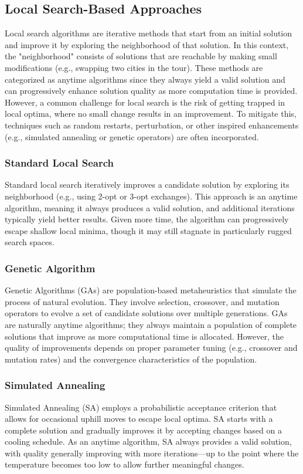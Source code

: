 \documentclass[11pt]{article}
\begin{document}
	\subsection{Local Search-Based Approaches}
	Local search algorithms are iterative methods that start from an initial solution and improve it by exploring the neighborhood of that solution. In this context, the "neighborhood" consists of solutions that are reachable by making small modifications (e.g., swapping two cities in the tour). These methods are categorized as anytime algorithms since they always yield a valid solution and can progressively enhance solution quality as more computation time is provided. However, a common challenge for local search is the risk of getting trapped in local optima, where no small change results in an improvement. To mitigate this, techniques such as random restarts, perturbation, or other inspired enhancements (e.g., simulated annealing or genetic operators) are often incorporated.
	
	\subsubsection{Standard Local Search}
	Standard local search iteratively improves a candidate solution by exploring its neighborhood (e.g., using 2-opt or 3-opt exchanges). This approach is an anytime algorithm, meaning it always produces a valid solution, and additional iterations typically yield better results. Given more time, the algorithm can progressively escape shallow local minima, though it may still stagnate in particularly rugged search spaces.
	
	\subsubsection{Genetic Algorithm}
	Genetic Algorithms (GAs) are population-based metaheuristics that simulate the process of natural evolution. They involve selection, crossover, and mutation operators to evolve a set of candidate solutions over multiple generations. GAs are naturally anytime algorithms; they always maintain a population of complete solutions that improve as more computational time is allocated. However, the quality of improvements depends on proper parameter tuning (e.g., crossover and mutation rates) and the convergence characteristics of the population.
	
	\subsubsection{Simulated Annealing}
	Simulated Annealing (SA) employs a probabilistic acceptance criterion that allows for occasional uphill moves to escape local optima. SA starts with a complete solution and gradually improves it by accepting changes based on a cooling schedule. As an anytime algorithm, SA always provides a valid solution, with quality generally improving with more iterations—up to the point where the temperature becomes too low to allow further meaningful changes.
	
\end{document}
